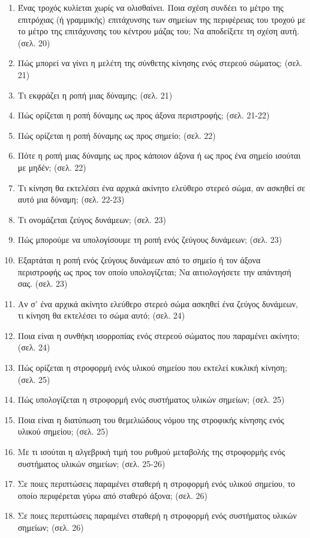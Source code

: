 \documentclass{article}
\begin{document}
\begin{enumerate}
\begin{itemize}
                  \item[β)] το σημείο επαφής του τροχού με το δάπεδο έχει ταχύτητα ίση με μηδέν. (σελ. 19-20)
            \end{itemize}
      \item Ένας τροχός κυλίεται χωρίς να ολισθαίνει. Ποια σχέση συνδέει το μέτρο της επιτρόχιας (ή γραμμικής) επιτάχυνσης των σημείων της περιφέρειας του τροχού με το μέτρο της επιτάχυνσης του κέντρου μάζας του; Να αποδείξετε τη σχέση αυτή. (σελ. 20)
      \item Πώς μπορεί να γίνει η μελέτη της σύνθετης κίνησης ενός στερεού σώματος; (σελ. 21)
      \item Τι εκφράζει η ροπή μιας δύναμης; (σελ. 21)
      \item Πώς ορίζεται η ροπή δύναμης ως προς άξονα περιστροφής; (σελ. 21-22)
      \item Πώς ορίζεται η ροπή δύναμης ως προς σημείο; (σελ. 22)
      \item Πότε η ροπή μιας δύναμης ως προς κάποιον άξονα ή ως προς ένα σημείο ισούται με μηδέν; (σελ. 22)
      \item Τι κίνηση θα εκτελέσει ένα αρχικά ακίνητο ελεύθερο στερεό σώμα, αν ασκηθεί σε αυτό μια δύναμη; (σελ. 22-23)
      \item Τι ονομάζεται ζεύγος δυνάμεων; (σελ. 23)
      \item Πώς μπορούμε να υπολογίσουμε τη ροπή ενός ζεύγους δυνάμεων; (σελ. 23)
      \item Εξαρτάται η ροπή ενός ζεύγους δυνάμεων από το σημείο ή τον άξονα περιστροφής ως προς τον οποίο υπολογίζεται; Να αιτιολογήσετε την απάντησή σας. (σελ. 23)
      \item Αν σ' ένα αρχικά ακίνητο ελεύθερο στερεό σώμα ασκηθεί ένα ζεύγος δυνάμεων, τι κίνηση θα εκτελέσει το σώμα αυτό; (σελ. 24)
      \item Ποια είναι η συνθήκη ισορροπίας ενός στερεού σώματος που παραμένει ακίνητο; (σελ. 24)
      \item Πώς ορίζεται η στροφορμή ενός υλικού σημείου που εκτελεί κυκλική κίνηση; (σελ. 25)
      \item Πώς υπολογίζεται η στροφορμή ενός συστήματος υλικών σημείων; (σελ. 25)
      \item Ποια είναι η διατύπωση του θεμελιώδους νόμου της στροφικής κίνησης ενός υλικού σημείου; (σελ. 25)
      \item Με τι ισούται η αλγεβρική τιμή του ρυθμού μεταβολής της στροφορμής ενός συστήματος υλικών σημείων; (σελ. 25-26)
      \item Σε ποιες περιπτώσεις παραμένει σταθερή η στροφορμή ενός υλικού σημείου, το οποίο περιφέρεται γύρω από σταθερό άξονα; (σελ. 26)
      \item Σε ποιες περιπτώσεις παραμένει σταθερή η στροφορμή ενός συστήματος υλικών σημείων; (σελ. 26)
\end{enumerate}
\end{document}
